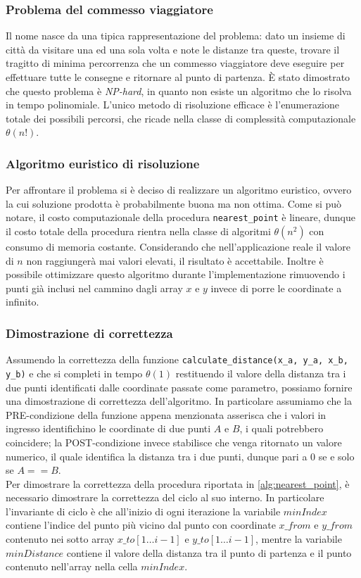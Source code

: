 \subsubsection{Problema del commesso viaggiatore}
Il nome nasce da una tipica rappresentazione del problema: dato un insieme di città da visitare una ed una sola volta e note le distanze tra queste, trovare il tragitto di minima percorrenza che un commesso viaggiatore deve eseguire per effettuare tutte le consegne e ritornare al punto di partenza. È stato dimostrato che questo problema è \textit{NP-hard}, in quanto non esiste un algoritmo che lo risolva in tempo polinomiale. L'unico metodo di risoluzione efficace è l'enumerazione totale dei possibili percorsi, che ricade nella classe di complessità computazionale $\theta(n!)$.

\subsubsection{Algoritmo euristico di risoluzione}
Per affrontare il problema si è deciso di realizzare un algoritmo euristico, ovvero la cui soluzione prodotta è probabilmente buona ma non ottima.
Come si può notare, il costo computazionale della procedura \verb|nearest_point| è lineare, dunque il costo totale della procedura rientra nella classe di algoritmi $\theta(n^2)$ con consumo di memoria costante. Considerando che nell'applicazione reale il valore di $n$ non raggiungerà mai valori elevati, il risultato è accettabile. Inoltre è possibile ottimizzare questo algoritmo durante l'implementazione rimuovendo i punti già inclusi nel cammino dagli array $x$ e $y$ invece di porre le coordinate a infinito.

\subsubsection{Dimostrazione di correttezza}
Assumendo la correttezza della funzione \verb|calculate_distance(x_a, y_a, x_b, y_b)| e che si completi in tempo $\theta(1)$ restituendo il valore della distanza tra i due punti identificati dalle coordinate passate come parametro, possiamo fornire una dimostrazione di correttezza dell'algoritmo. In particolare assumiamo che la PRE-condizione della funzione appena menzionata asserisca che i valori in ingresso identifichino le coordinate di due punti $A$ e $B$, i quali potrebbero coincidere; la POST-condizione invece stabilisce che venga ritornato un valore numerico, il quale identifica la distanza tra i due punti, dunque pari a $0$ se e solo se $A == B$.\\
Per dimostrare la correttezza della procedura riportata in \ref{alg:nearest_point}, è necessario dimostrare la correttezza del ciclo al suo interno. In particolare l'invariante di ciclo è che all'inizio di ogni iterazione la variabile $minIndex$ contiene l'indice del punto più vicino dal punto con coordinate $x\_from$ e $y\_from$ contenuto nei sotto array $x\_to[1 \dotso i-1]$ e $y\_to[1 \dotso i-1]$, mentre la variabile $minDistance$ contiene il valore della distanza tra il punto di partenza e il punto contenuto nell'array nella cella $minIndex$.

